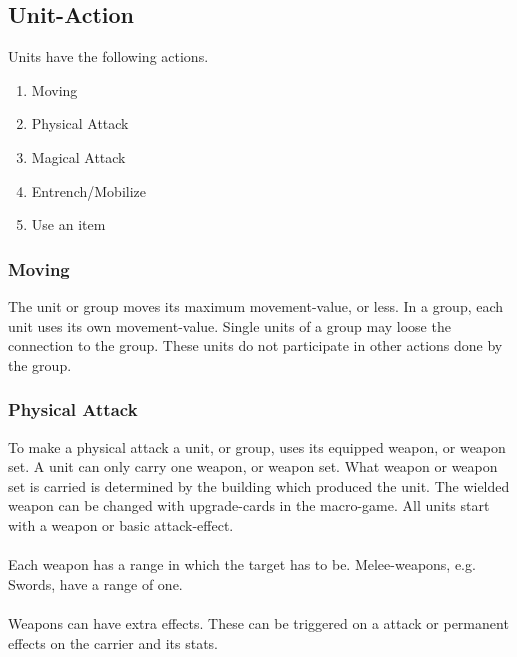 \documentclass[a5paper,pagesize,10pt,bibtotoc,pointlessnumbers,
normalheadings,DIV=9,twoside=false]{scrbook}
\begin{document}
\subsection{Unit-Action}
Units have the following actions.

\begin{enumerate}
\item Moving
\item Physical Attack
\item Magical Attack
\item Entrench/Mobilize
\item Use an item
\end{enumerate}

\subsubsection{Moving}
The unit or group moves its maximum movement-value, or less.
In a group, each unit uses its own movement-value. Single units of a group may loose the connection to the group. These units do not participate in other actions done by the group.

\subsubsection{Physical Attack}
To make a physical attack a unit, or group, uses its equipped weapon, or weapon set. 
A unit can only carry one weapon, or weapon set.
What weapon or weapon set is carried is determined by the building which produced the unit. The wielded weapon can be changed with upgrade-cards in the macro-game.
All units start with a weapon or basic attack-effect.\\
\\
Each weapon has a range in which the target has to be. Melee-weapons, e.g. Swords, have a range of one.\\
\\
Weapons can have extra effects. These can be triggered on a attack or permanent effects on the carrier and its stats.\\
\end{document}
